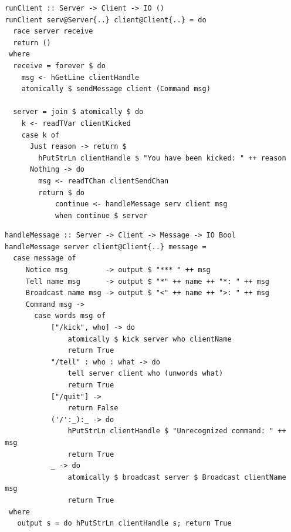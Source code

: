 \documentclass{beamer}
\begin{document}

\begin{frame}[fragile]

\begin{verbatim}
runClient :: Server -> Client -> IO ()
runClient serv@Server{..} client@Client{..} = do
  race server receive
  return ()
 where
  receive = forever $ do
    msg <- hGetLine clientHandle
    atomically $ sendMessage client (Command msg)

  server = join $ atomically $ do
    k <- readTVar clientKicked
    case k of
      Just reason -> return $
        hPutStrLn clientHandle $ "You have been kicked: " ++ reason
      Nothing -> do
        msg <- readTChan clientSendChan
        return $ do
            continue <- handleMessage serv client msg
            when continue $ server
\end{verbatim}

\end{frame}


\begin{frame}[fragile]

\begin{verbatim}
handleMessage :: Server -> Client -> Message -> IO Bool
handleMessage server client@Client{..} message =
  case message of
     Notice msg         -> output $ "*** " ++ msg
     Tell name msg      -> output $ "*" ++ name ++ "*: " ++ msg
     Broadcast name msg -> output $ "<" ++ name ++ ">: " ++ msg
     Command msg ->
       case words msg of
           ["/kick", who] -> do
               atomically $ kick server who clientName
               return True
           "/tell" : who : what -> do
               tell server client who (unwords what)
               return True
           ["/quit"] ->
               return False
           ('/':_):_ -> do
               hPutStrLn clientHandle $ "Unrecognized command: " ++ msg
               return True
           _ -> do
               atomically $ broadcast server $ Broadcast clientName msg
               return True
 where
   output s = do hPutStrLn clientHandle s; return True
\end{verbatim}

\end{frame}


\begin{frame}[fragile]

\begin{verbatim}
\end{verbatim}

\end{frame}
\end{document}
